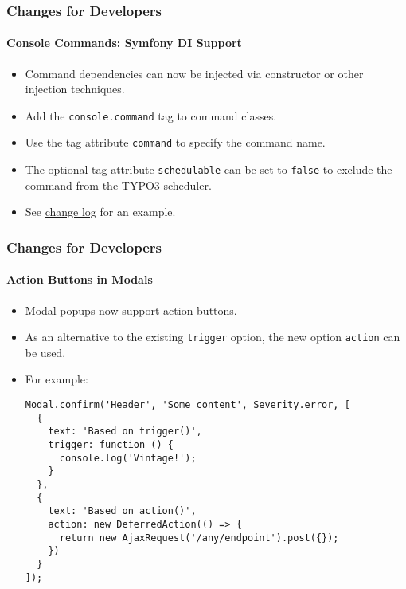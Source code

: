 \begin{frame}[fragile]
	\frametitle{Changes for Developers}
	\framesubtitle{Console Commands: Symfony DI Support}

	\begin{itemize}
		\item Command dependencies can now be injected via constructor or other injection techniques.
		\item Add the \texttt{console.command} tag to command classes.
		\item Use the tag attribute \texttt{command} to specify the command name.
		\item The optional tag attribute \texttt{schedulable} can be set to \texttt{false}
			to exclude the command from the TYPO3 scheduler.

		\item See
			\href{https://docs.typo3.org/c/typo3/cms-core/master/en-us/Changelog/10.3/Feature-89139-AddDependencyInjectionSupportForConsoleCommands.html}{change log}
			for an example.
	\end{itemize}

\end{frame}


\begin{frame}[fragile]
	\frametitle{Changes for Developers}
	\framesubtitle{Action Buttons in Modals}

	\lstset{basicstyle=\tiny\ttfamily}

	\begin{itemize}
		\item Modal popups now support action buttons.
		\item As an alternative to the existing \texttt{trigger} option, the new option
			\texttt{action} can be used.
		\item For example:

\vspace{-0.4cm}
\begin{lstlisting}
Modal.confirm('Header', 'Some content', Severity.error, [
  {
    text: 'Based on trigger()',
    trigger: function () {
      console.log('Vintage!');
    }
  },
  {
    text: 'Based on action()',
    action: new DeferredAction(() => {
      return new AjaxRequest('/any/endpoint').post({});
    })
  }
]);
\end{lstlisting}

	\end{itemize}

\end{frame}

